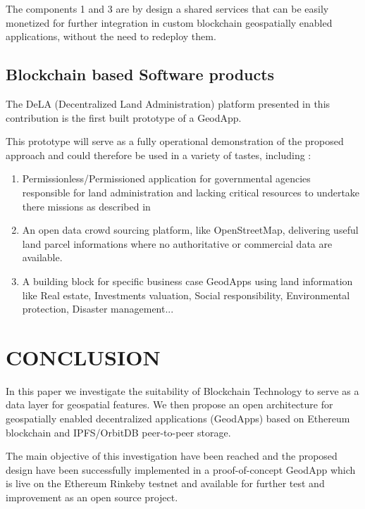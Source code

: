 \documentclass{isprs} %
\begin{document}
The components 1 and 3 are by design a shared services that can be easily monetized for further integration in custom blockchain geospatially enabled applications, without the need to redeploy them.

\subsection{Blockchain based Software products}\label{sec:Blockchain based Software products}

The DeLA (Decentralized Land Administration) platform presented in this contribution is the first built prototype of a GeodApp.

This prototype will serve as a fully operational demonstration of the proposed approach and could therefore be used in a variety of tastes, including :
\begin{enumerate}
\setlength\itemsep{0em}\setlength\parskip{0em}\setlength\topsep{0em}\setlength\partopsep{0em}\setlength\parsep{0em} 
\item{Permissionless/Permissioned application for governmental agencies responsible for land administration and lacking critical resources to undertake there missions as described in \cite{mckay2016voluntary}}
\item{An open data crowd sourcing platform, like OpenStreetMap, delivering useful land parcel informations where no authoritative or commercial data are available.}
\item{A building block for specific business case GeodApps using land information like Real estate, Investments valuation, Social responsibility, Environmental protection, Disaster management...}
\end{enumerate}

\section{CONCLUSION}\label{sec:CONCLUSION}

In this paper we investigate the suitability of Blockchain Technology to serve as a data layer for geospatial features. We then propose an open architecture for geospatially enabled decentralized applications (GeodApps) based on Ethereum blockchain and IPFS/OrbitDB peer-to-peer storage.

The main objective of this investigation have been reached and the proposed design have been successfully implemented in a proof-of-concept GeodApp which is live on the Ethereum Rinkeby testnet and available for further test and improvement as an open source project.
 
\end{document}
